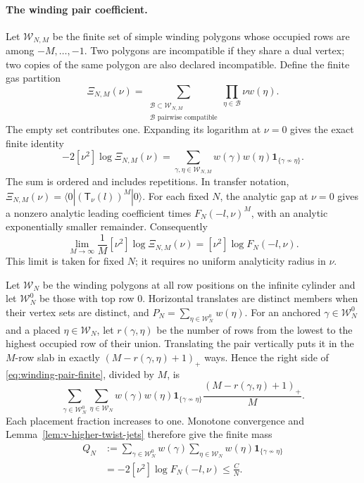 \paragraph{The winding pair coefficient.}
Let $\mathscr W_{N,M}$ be the finite set of simple winding polygons whose
occupied rows are among $-M,\ldots,-1$. Two polygons are incompatible if
they share a dual vertex; two copies of the same polygon are also declared
incompatible. Define the finite gas partition
\[
 \Xi_{N,M}(\nu)=
 \sum_{\substack{\mathcal B\subset\mathscr W_{N,M}\\
                  \mathcal B\text{ pairwise compatible}}}
       \prod_{\eta\in\mathcal B}\nu w(\eta).
\]
The empty set contributes one. Expanding its logarithm at $\nu=0$ gives
the exact finite identity
\begin{equation}\label{eq:winding-pair-finite}
 -2[\nu^2]\log\Xi_{N,M}(\nu)
   =\sum_{\gamma,\eta\in\mathscr W_{N,M}}
       w(\gamma)w(\eta)\mathbf1_{\{\gamma\not\sim\eta\}}.
\end{equation}
The sum is ordered and includes repetitions. In transfer notation,
$\Xi_{N,M}(\nu)=\langle0|(\mathsf T_\nu(l))^M|0\rangle$. For each fixed $N$, the
analytic gap at $\nu=0$ gives a nonzero analytic leading coefficient
times $F_N(-l,\nu)^M$, with an analytic exponentially smaller remainder.
Consequently
\[
 \lim_{M\to\infty}\frac1M[\nu^2]\log\Xi_{N,M}(\nu)
       =[\nu^2]\log F_N(-l,\nu).
\]
This limit is taken for fixed $N$; it requires no uniform analyticity
radius in $\nu$.

Let $\mathscr W_N$ be the winding polygons at all row positions on the
infinite cylinder and let $\mathscr W_N^0$ be those with top row $0$.
Horizontal translates are distinct members when their vertex sets are
distinct, and $P_N=\sum_{\eta\in\mathscr W_N^0}w(\eta)$. For an anchored
$\gamma\in\mathscr W_N^0$ and a placed
$\eta\in\mathscr W_N$, let $r(\gamma,\eta)$ be the number of rows from the
lowest to the highest occupied row of their union. Translating the pair
vertically puts it in the $M$-row slab in exactly
$(M-r(\gamma,\eta)+1)_+$ ways. Hence the right side of
\eqref{eq:winding-pair-finite}, divided by $M$, is
\[
 \sum_{\gamma\in\mathscr W_N^0}\sum_{\eta\in\mathscr W_N}
 w(\gamma)w(\eta)\mathbf1_{\{\gamma\not\sim\eta\}}
       \frac{(M-r(\gamma,\eta)+1)_+}{M}.
\]
Each placement fraction increases to one. Monotone convergence and
Lemma~\ref{lem:v-higher-twist-jets} therefore give the finite mass
\begin{equation}\label{eq:winding-pair-mass}
 \begin{split}
 Q_N&:=\sum_{\gamma\in\mathscr W_N^0}w(\gamma)
       \sum_{\eta\in\mathscr W_N}
          w(\eta)\mathbf1_{\{\gamma\not\sim\eta\}}\\
   &=-2[\nu^2]\log F_N(-l,\nu)\le \frac{C}{N}.
 \end{split}
\end{equation}

